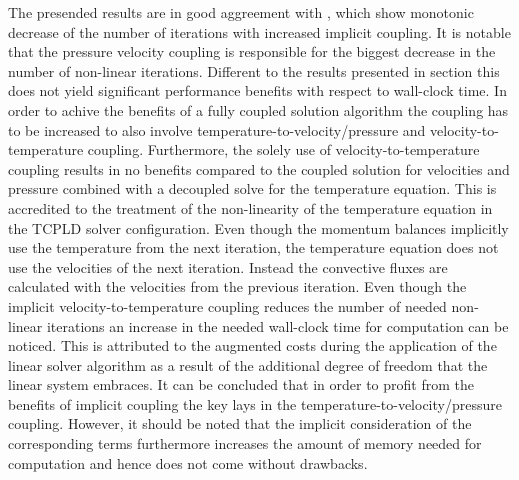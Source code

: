 The presended results are in good aggreement with \cite{vakilipour12}, which show monotonic decrease of the number of iterations with increased implicit coupling. It is notable that the pressure velocity coupling is responsible for the biggest decrease in the number of non-linear iterations. Different to the results presented in section \cite{sec:channel} this does not yield significant performance benefits with respect to wall-clock time. In order to achive the benefits of a fully coupled solution algorithm the coupling has to be increased to also involve temperature-to-velocity/pressure and velocity-to-temperature coupling. Furthermore, the solely use of velocity-to-temperature coupling results in no benefits compared to the coupled solution for velocities and pressure combined with a decoupled solve for the temperature equation. This is accredited to the treatment of the non-linearity of the temperature equation in the TCPLD solver configuration. Even though the momentum balances implicitly use the temperature from the next iteration, the temperature equation does not use the velocities of the next iteration. Instead the convective fluxes are calculated with the velocities from the previous iteration. Even though the implicit velocity-to-temperature coupling reduces the number of needed non-linear iterations an increase in the needed wall-clock time for computation can be noticed. This is attributed to the augmented costs during the application of the linear solver algorithm as a result of the additional degree of freedom that the linear system embraces.
It can be concluded that in order to profit from the benefits of implicit coupling the key lays in the temperature-to-velocity/pressure coupling. However, it should be noted that the implicit consideration of the corresponding terms furthermore increases the amount of memory needed for computation and hence does not come without drawbacks.


